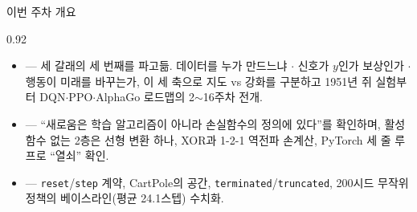 \begin{frame}{이번 주차 개요}
\begin{center}\begin{varwidth}{0.92\textwidth}
  \begin{itemize}
    \item {} — 세 갈래의 세 번째를 파고듦.
      데이터를 누가 만드느냐 $\cdot$ 신호가 $y$인가 보상인가 $\cdot$
      행동이 미래를 바꾸는가, 이 세 축으로 지도 vs 강화를 구분하고
      1951년 쥐 실험부터 DQN$\cdot$PPO$\cdot$AlphaGo 로드맵의
      2$\sim$16주차 전개.
    \item {} — ``새로움은 학습 알고리즘이 아니라
      손실함수의 정의에 있다''를 확인하며, 활성 함수 없는 2층은 선형
      변환 하나, XOR과 1-2-1 역전파 손계산, PyTorch 세 줄 루프로
      ``열쇠'' 확인.
    \item {} — \texttt{reset}/\texttt{step} 계약,
      CartPole의 공간, \texttt{terminated}/\texttt{truncated}, 200시드 무작위
      정책의 베이스라인(평균 24.1스텝) 수치화.
  \end{itemize}
\end{varwidth}\end{center}
\end{frame}
